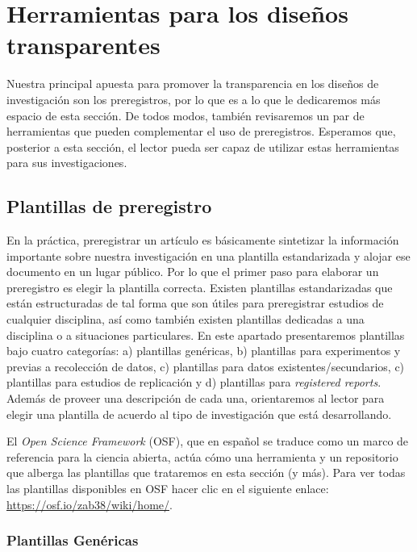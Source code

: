 \documentclass[
  spanish,
  letterpaper,
  DIV=11,
  numbers=noendperiod]{scrreprt}
\begin{document}
\section{Herramientas para los diseños
transparentes}\label{herramientas-para-los-diseuxf1os-transparentes}

Nuestra principal apuesta para promover la transparencia en los diseños
de investigación son los preregistros, por lo que es a lo que le
dedicaremos más espacio de esta sección. De todos modos, también
revisaremos un par de herramientas que pueden complementar el uso de
preregistros. Esperamos que, posterior a esta sección, el lector pueda
ser capaz de utilizar estas herramientas para sus investigaciones.

\subsection{Plantillas de preregistro}\label{plantillas-de-preregistro}

En la práctica, preregistrar un artículo es básicamente sintetizar la
información importante sobre nuestra investigación en una plantilla
estandarizada y alojar ese documento en un lugar público. Por lo que el
primer paso para elaborar un preregistro es elegir la plantilla
correcta. Existen plantillas estandarizadas que están estructuradas de
tal forma que son útiles para preregistrar estudios de cualquier
disciplina, así como también existen plantillas dedicadas a una
disciplina o a situaciones particulares. En este apartado presentaremos
plantillas bajo cuatro categorías: a) plantillas genéricas, b)
plantillas para experimentos y previas a recolección de datos, c)
plantillas para datos existentes/secundarios, c) plantillas para
estudios de replicación y d) plantillas para \emph{registered reports}.
Además de proveer una descripción de cada una, orientaremos al lector
para elegir una plantilla de acuerdo al tipo de investigación que está
desarrollando.

El \emph{Open Science Framework} (OSF), que en español se traduce como
un marco de referencia para la ciencia abierta, actúa cómo una
herramienta y un repositorio que alberga las plantillas que trataremos
en esta sección (y más). Para ver todas las plantillas disponibles en
OSF hacer clic en el siguiente enlace:
\url{https://osf.io/zab38/wiki/home/}.

\subsubsection{Plantillas Genéricas}\label{plantillas-genuxe9ricas}
\end{document}
